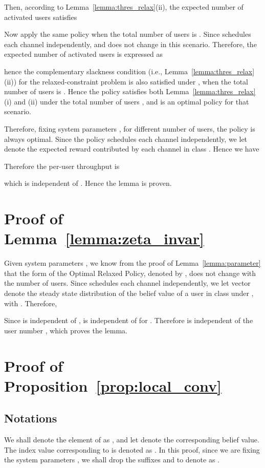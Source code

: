 \documentclass[11pt,twocolumn]{IEEEtran}
\begin{document}
Then, according to Lemma~\ref{lemma:thres_relax}(ii), the expected number of activated users satisfies


Now apply the same policy  when the total number of users is . Since  schedules each channel independently,  and  does not change in this scenario. Therefore, the expected number of activated users is expressed as

hence the complementary slackness condition (i.e., Lemma~\ref{lemma:thres_relax}(ii)) for the relaxed-constraint problem is also satisfied under , when the total number of users is . Hence the policy  satisfies both Lemma~\ref{lemma:thres_relax}(i) and (ii) under the total number of users , and is an optimal policy for that scenario.

Therefore, fixing system parameters , for different number  of users, the policy  is always optimal. Since the policy  schedules each channel independently, we let  denote the expected reward contributed by each channel in class . Hence we have


Therefore the per-user throughput is

which is independent of . Hence the lemma is proven.

\section{Proof of Lemma~\ref{lemma:zeta_invar}}
\label{appen:zeta_invar}

Given system parameters , we know from the proof of Lemma~\ref{lemma:parameter} that the form of the Optimal Relaxed Policy, denoted by , does not change with the number  of users. Since  schedules each channel independently, we let vector  denote the steady state distribution of the belief value of a user in class  under , with . Therefore,


Since  is independent of ,  is independent of  for . Therefore   is independent of the user number , which proves the lemma.

\section{Proof of Proposition~\ref{prop:local_conv}}
\label{appen:local}

\subsection{Notations}

We shall denote the  element of  as ,  and let  denote the corresponding belief value. The index value corresponding to  is denoted as . In this proof, since we are fixing the system parameters , we shall drop the suffixes  and  to denote  as .
\end{document}
